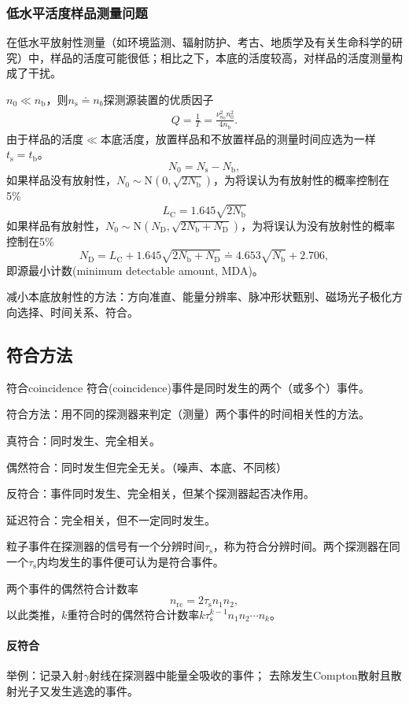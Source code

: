 \subsubsection{低水平活度样品测量问题}
在低水平放射性测量（如环境监测、辐射防护、考古、地质学及有关生命科学的研究）中，样品的活度可能很低；相比之下，本底的活度较高，对样品的活度测量构成了干扰。

$n_0\ll n_\mathrm b$，则$n_\mathrm s\doteq n_b$探测源装置的优质因子
\begin{align}
	Q=\frac1T=\frac{\nu_{n_0}^2n_0^2}{4n_\mathrm b}.
\end{align}
由于样品的活度$\ll$本底活度，放置样品和不放置样品的测量时间应选为一样$t_\mathrm s=t_\mathrm b$。
\[
	N_0=N_\mathrm s-N_\mathrm b,
\]
如果样品没有放射性，$N_0\sim\mathrm N(0,\sqrt{2N_\mathrm b})$，为将误认为有放射性的概率控制在5\%
\[
	L_\mathrm C=1.645\sqrt{2 N_\mathrm b}
\]
如果样品有放射性，$N_0\sim\mathrm N(N_\mathrm D,\sqrt{2N_\mathrm b+N_\mathrm D})$，为将误认为没有放射性的概率控制在5\%
\[
	N_\mathrm D=L_\mathrm C+1.645\sqrt{2N_\mathrm b+N_\mathrm D}\doteq 4.653\sqrt{N_\mathrm b}+2.706,
\]
即源最小计数(minimum detectable amount, MDA)。

减小本底放射性的方法：方向准直、能量分辨率、脉冲形状甄别、磁场光子极化方向选择、时间关系、符合。
\subsection{符合方法}
\begin{definition}{符合}{coincidence}
	符合(coincidence)事件是同时发生的两个（或多个）事件。

	符合方法：用不同的探测器来判定（测量）两个事件的时间相关性的方法。

	真符合：同时发生、完全相关。

	偶然符合：同时发生但完全无关。（噪声、本底、不同核）

	反符合：事件同时发生、完全相关，但某个探测器起否决作用。

	延迟符合：完全相关，但不一定同时发生。
\end{definition}
粒子事件在探测器的信号有一个分辨时间$\tau_\mathrm s$，称为符合分辨时间。两个探测器在同一个$\tau_\mathrm s$内均发生的事件便可认为是符合事件。

两个事件的偶然符合计数率
\[
	n_{\mathrm{rc}}=2\tau_\mathrm sn_1n_2,
\]
以此类推，$k$重符合时的偶然符合计数率$k\tau_\mathrm s^{k-1}n_1n_2\cdots n_{k}$。
\paragraph{反符合}
举例：记录入射$\gamma$射线在探测器中能量全吸收的事件；
去除发生Compton散射且散射光子又发生逃逸的事件。

